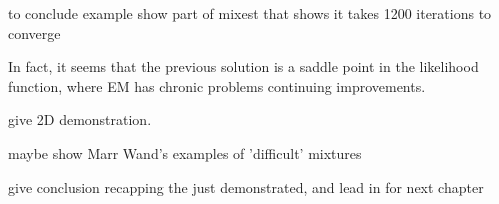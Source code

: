 to conclude example show part of mixest that shows it takes 1200 iterations to converge

In fact, it seems that the previous solution is a saddle point in the likelihood function, where EM has chronic problems continuing improvements.

give 2D demonstration.

maybe show Marr Wand's examples of 'difficult' mixtures

give conclusion recapping the just demonstrated, and lead in for next chapter

